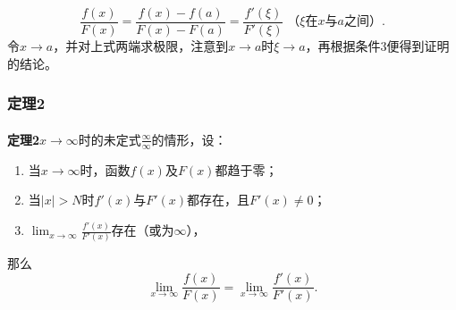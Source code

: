 \begin{equation}
  \frac{f(x)}{F(x)} = \frac{f(x) - f(a)}{F(x) - F(a)} = \frac{f'(\xi)}{F'(\xi)} \; \text{（$\xi$在$x$与$a$之间）}.
\end{equation}
令$x \to a$，并对上式两端求极限，注意到$x\to a$时$\xi \to a$，再根据条件$3$便得到证明的结论。

\subsubsection{定理2}
\paragraph{}
\textbf{定理2\;}$x \to \infty$时的未定式$\frac{\infty}{\infty}$的情形，设：
\begin{enumerate}
  \item 当$x \to \infty$时，函数$f(x)$及$F(x)$都趋于零；
  \item 当$|x|>N$时$f'(x)$与$F'(x)$都存在，且$F'(x) \neq 0$；
  \item $\displaystyle \lim_{x \to \infty}\frac{f'(x)}{F'(x)}$存在（或为$\infty$），
\end{enumerate}
那么
\begin{equation}
  \lim_{x\to \infty}\frac{f(x)}{F(x)} = \lim_{x\to \infty}\frac{f'(x)}{F'(x)}.
\end{equation}
